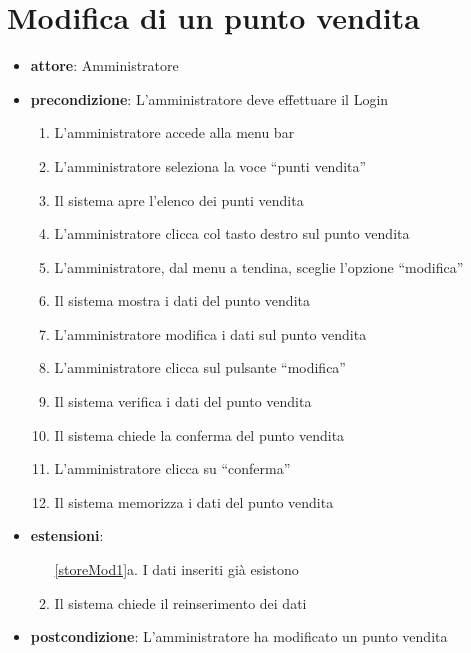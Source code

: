 \section{Modifica di un punto vendita}
\begin{itemize}
	\item \textbf{attore}: Amministratore
	\item \textbf{precondizione}: L’amministratore deve effettuare il Login
	
	\begin{enumerate}
		\item L’amministratore accede alla menu bar
		\item L’amministratore seleziona la voce “punti vendita”
		\item Il sistema apre l’elenco dei punti vendita
		\item L’amministratore clicca col tasto destro sul punto  vendita
		\item L’amministratore, dal menu a tendina, sceglie l’opzione “modifica”
		\item Il sistema mostra i dati del punto vendita
		\item L’amministratore modifica i dati sul punto vendita
		\item L’amministratore clicca sul pulsante “modifica”
		\label{storeMod1}
		\item Il sistema verifica i dati del punto vendita
		\item Il sistema chiede la conferma del punto vendita
		\item L’amministratore clicca su “conferma”
		\item Il sistema memorizza i dati del punto vendita
	\end{enumerate}

	\item \textbf{estensioni}:
	\begin{enumerate}
		\item[\ref{storeMod1}a.] I dati inseriti già esistono
		\item Il sistema chiede il reinserimento dei dati
	\end{enumerate}

	\item \textbf{postcondizione}: L’amministratore ha modificato un punto vendita
\end{itemize}



